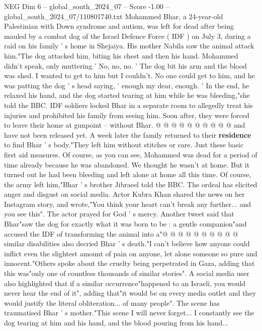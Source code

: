 \begin{textsample}{NEG Dim 6 – global\_south\_2024\_07 – Score -1.00 – global\_south\_2024\_07/110801740.txt}  \label{ex:f6_neg_123}
Mohammed Bhar, a 24-year-old Palestinian with Down syndrome and autism, was left for dead after being mauled by a combat dog of the Israel Defence Force ( IDF ) on July 3, during a raid on his family ' s home in Shejaiya.
His mother Nabila saw the animal attack him."The dog attacked him, biting his chest and then his hand.
Mohammed didn't speak, only muttering ' No, no, no. ' The dog bit his arm and the blood was shed.
I wanted to get to him but I couldn't.
No one could get to him, and he was patting the dog ' s head saying, ' enough my dear, enough. ' In the end, he relaxed his hand, and the dog started tearing at him while he was bleeding,"she told the BBC.
IDF soldiers locked Bhar in a separate room to allegedly treat his injuries and prohibited his family from seeing him.
Soon after, they were forced to leave their home at gunpoint -- without Bhar. @ @ @ @ @ @ @ @ @ @ and have not been released yet.
A week later the family returned to their \textbf{residence} to find Bhar ' s body."They left him without stitches or care.
Just these basic first aid measures.
Of course, as you can see, Mohammed was dead for a period of time already because he was abandoned.
We thought he wasn't at home.
But it turned out he had been bleeding and left alone at home all this time.
Of course, the army left him,"Bhar ' s brother Jibraeel told the BBC.
The ordeal has elicited anger and disgust on social media.
Actor Kubra Khan shared the news on her Instagram story, and wrote,"You think your heart can't break any further... and you see this".
The actor prayed for God ' s mercy.
Another tweet said that Bhar"saw the dog for exactly what it was born to be : a gentle companion"and accused the IDF of transforming the animal into a"@ @ @ @ @ @ @ @ @ @ similar disabilities also decried Bhar ' s death."I can't believe how anyone could inflict even the slightest amount of pain on anyone, let alone someone so pure and innocent."Others spoke about the cruelty being perpetrated in Gaza, adding that this was"only one of countless thousands of similar stories".
A social media user also highlighted that if a similar occurrence"happened to an Israeli, you would never hear the end of it", adding that"it would be on every media outlet and they would justify the literal obliteration... of many people".
The scene has traumatised Bhar ' s mother."This scene I will never forget...
I constantly see the dog tearing at him and his hand, and the blood pouring from his hand...

\end{textsample}
